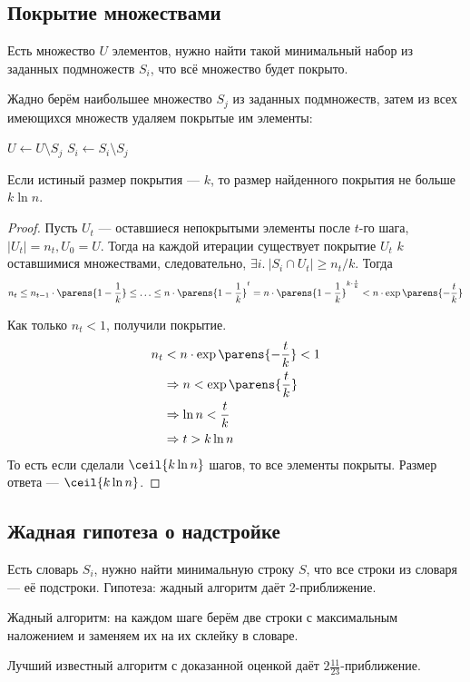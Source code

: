 \subsection{Покрытие множествами}
Есть множество $U$ элементов,
нужно найти такой минимальный набор из заданных подмножеств $S_i$,
что всё множество будет покрыто.

Жадно берём наибольшее множество $S_j$ из заданных подмножеств,
затем из всех имеющихся множеств удаляем покрытые им элементы:
\begin{algorithmic}
    \State $U \gets U \setminus S_j$
    \State $S_i \gets S_i \setminus S_j$
\end{algorithmic}

\begin{theorem}
    Если истиный размер покрытия --- $k$,
    то размер найденного покрытия не больше $k \ln n$.
\end{theorem}
\begin{proof}
    Пусть $U_t$ --- оставшиеся непокрытыми элементы после $t$-го шага,
    $|U_t| = n_t, U_0 = U$.
    Тогда на каждой итерации существует покрытие
    $U_t$ $k$ оставшимися множествами, следовательно,
    $\exists i.~|S_i \cap U_t| \ge n_t / k$.
    Тогда
    \[
        n_t
        \le n_{t - 1} \cdot \parens{1 - \frac{1}{k}}
        \le \ldots
        \le n \cdot \parens{1 - \frac{1}{k}}^t
        = n \cdot \parens{1 - \frac{1}{k}}^{k \cdot \frac{t}{k}}
        < n \cdot \exp \parens{-\frac{t}{k}}
    \]

    Как только $n_t < 1$, получили покрытие.
    \begin{align*}
        n_t & < n \cdot \exp \parens{-\frac{t}{k}} < 1 \\
        & \Rightarrow n < \exp \parens{\frac{t}{k}} \\
        & \Rightarrow \ln n < \frac{t}{k} \\
        & \Rightarrow t > k \ln n
    \end{align*}
    То есть если сделали $\ceil{k \ln n}$ шагов,
    то все элементы покрыты.
    Размер ответа --- $\ceil{k \ln n}$.
\end{proof}

\subsection{Жадная гипотеза о надстройке}
Есть словарь $S_i$, нужно найти минимальную строку $S$,
что все строки из словаря --- её подстроки.
Гипотеза: жадный алгоритм даёт 2-приближение.

Жадный алгоритм: на каждом шаге берём две строки
с максимальным наложением и заменяем их на их склейку в словаре.

Лучший известный алгоритм с доказанной оценкой
даёт $2\frac{11}{23}$-приближение.
